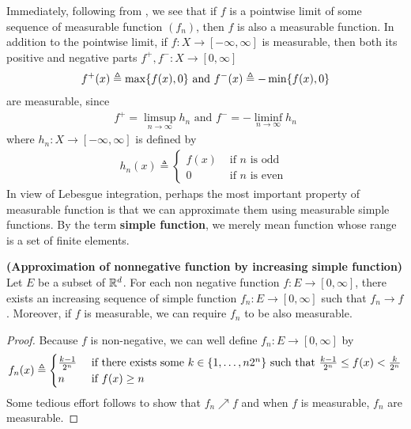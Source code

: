 \documentclass{report}
\begin{document}
\begin{mdframed}
Immediately, following from , we see that if $f$ is a pointwise limit of some sequence of measurable function $(f_n)$, then $f$ is also a measurable function. In addition to the pointwise limit, if $f:X\rightarrow [-\infty,\infty]$ is measurable, then both its positive and negative parts  $f^+,f^-:X\rightarrow [0,\infty]$ 
\begin{align*}
f^+(x)\triangleq \max \{ f(x),0 \}\text{ and }f^-(x)\triangleq  - \min  \{ f(x),0 \}
\end{align*}
are measurable, since 
\begin{align*}
f^+=\limsup_{n\to\infty} h_n\text{ and }f^-=-\liminf_{n\to\infty} h_n
\end{align*}
where $h_n:X\rightarrow [-\infty,\infty]$ is defined by 
\begin{align*}
h_n(x)\triangleq \begin{cases}
  f(x)& \text{ if $n$ is odd }\\
  0& \text{ if $n$ is even }
\end{cases}
\end{align*}
In view of Lebesgue integration, perhaps the most important property of measurable function is that we can approximate them using measurable simple functions. By the term \textbf{simple function}, we merely mean function whose range is a set of finite elements. 
\end{mdframed}
\begin{theorem}
\label{Approximation of nonnegative function by increasing simple function}
\textbf{(Approximation of nonnegative function by increasing simple function)} Let $E$ be a subset of  $\mathbb{R}^d$. For each non negative function  $f:E\rightarrow [0,\infty]$, there exists an increasing sequence of simple function $f_n:E\rightarrow [0,\infty]$ such that $f_n \to f$. Moreover, if $f$ is measurable, we can require $f_n$ to be also measurable.
\end{theorem}
\begin{proof}
Because  $f$ is non-negative, we can well define $f_n:E\rightarrow [0,\infty]$ by 
\begin{align*}
f_n(x)\triangleq \begin{cases}
  \frac{k-1}{2^n}& \text{ if there exists some $k\in \{ 1,\dots ,n2^n \}$ such that }\frac{k-1}{2^n}\leq f(x)< \frac{k}{2^n}\\
  n& \text{ if $f(x)\geq n$ }
\end{cases}
\end{align*}
Some tedious effort follows to show that $f_n\nearrow f$ and  when  $f$ is measurable, $f_n$ are measurable. 
\end{proof}
\end{document}
